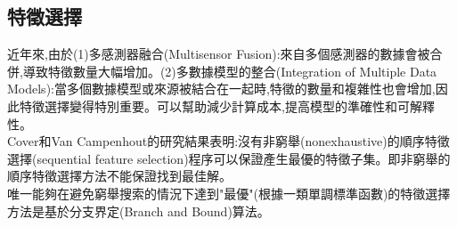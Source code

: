 \documentclass[10pt, a4paper]{article}
\begin{document}
\begin{CJK*}{UTF8}{bsmi}
\subsection{特徵選擇}
近年來,由於(1)多感測器融合(Multisensor Fusion):來自多個感測器的數據會被合併,導致特徵數量大幅增加。(2)多數據模型的整合(Integration of Multiple Data Models):當多個數據模型或來源被結合在一起時,特徵的數量和複雜性也會增加,因此特徵選擇變得特別重要。可以幫助減少計算成本,提高模型的準確性和可解釋性。\\[0.5em]
Cover和Van Campenhout的研究結果表明:沒有非窮舉(nonexhaustive)的順序特徵選擇(sequential feature selection)程序可以保證產生最優的特徵子集。即非窮舉的順序特徵選擇方法不能保證找到最佳解。\\[0.5em]
唯一能夠在避免窮舉搜索的情況下達到"最優"(根據一類單調標準函數)的特徵選擇方法是基於分支界定(Branch and Bound)算法。


\end{CJK*}
\end{document}
